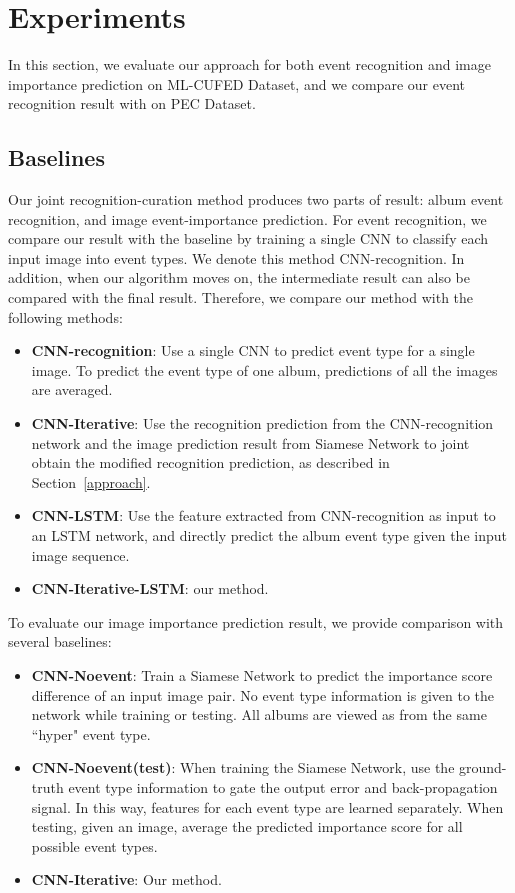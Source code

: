 \documentclass[runningheads]{llncs}
\begin{document}
\section{Experiments}
In this section, we evaluate our approach for both event recognition and image importance prediction on ML-CUFED Dataset, and we compare our event recognition result with \cite{HMM} on PEC Dataset.
\subsection{Baselines}
Our joint recognition-curation method produces two parts of result: album event recognition, and image event-importance prediction. 
For event recognition, we compare our result with the baseline by training a single CNN to classify each input image into event types. We denote this method CNN-recognition. In addition, when our algorithm moves on, the intermediate result can also be compared with the final result. Therefore, we compare our method with the following methods:
\begin{itemize}
  \item \textbf{CNN-recognition}: Use a single CNN to predict event type for a single image. To predict the event type of one album, predictions of all the images are averaged.
  \item \textbf{CNN-Iterative}: Use the recognition prediction from the CNN-recognition network and the image prediction result from Siamese Network to joint obtain the modified recognition prediction, as described in Section~\ref{approach}.
  \item \textbf{CNN-LSTM}: Use the feature extracted from CNN-recognition as input to an LSTM network, and directly predict the album event type given the input image sequence.
  \item \textbf{CNN-Iterative-LSTM}: our method.
\end{itemize}

To evaluate our image importance prediction result, we provide comparison with several baselines:
\begin{itemize}
  \item \textbf{CNN-Noevent}: Train a Siamese Network to predict the importance score difference of an input image pair. No event type information is given to the network while training or testing. All albums are viewed as from the same ``hyper" event type.
  \item \textbf{CNN-Noevent(test)}: When training the Siamese Network, use the ground-truth event type information to gate the output error and back-propagation signal. In this way, features for each event type are learned separately. When testing, given an image, average the predicted importance score for all possible event types.  
    \item \textbf{CNN-Iterative}: Our method.
    \end{itemize}
\end{document}
